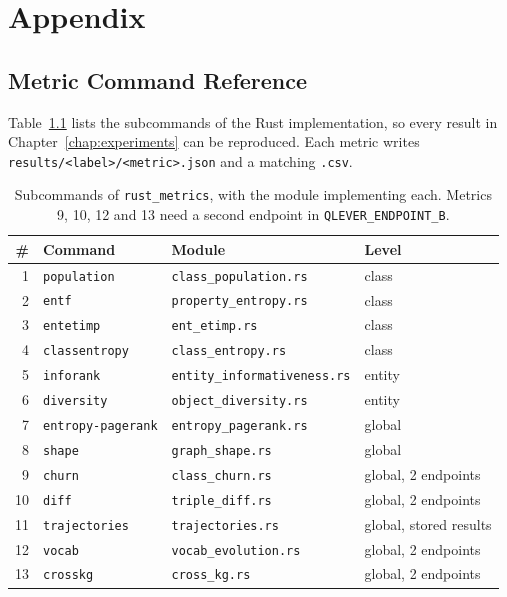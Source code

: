 \chapter{Appendix}
\label{chap:appendix}

\section{Metric Command Reference}
\label{sec:appendix_commands}

Table~\ref{tab:commands} lists the subcommands of the Rust implementation, so
every result in Chapter~\ref{chap:experiments} can be reproduced. Each metric
writes \texttt{results/<label>/<metric>.json} and a matching \texttt{.csv}.

\begin{table}[htbp]
  \centering
  \caption[]{Subcommands of \texttt{rust\_metrics}, with
    the module implementing each. Metrics 9, 10, 12 and 13 need a second
    endpoint in \texttt{QLEVER\_ENDPOINT\_B}.}
  \label{tab:commands}
  \footnotesize
  \begin{tabular}{rlll}
    \toprule
    \# & Command & Module & Level \\
    \midrule
    1  & \texttt{population}       & \texttt{class\_population.rs}       & class \\
    2  & \texttt{entf}             & \texttt{property\_entropy.rs}       & class \\
    3  & \texttt{entetimp}         & \texttt{ent\_etimp.rs}              & class \\
    4  & \texttt{classentropy}     & \texttt{class\_entropy.rs}          & class \\
    5  & \texttt{inforank}         & \texttt{entity\_informativeness.rs} & entity \\
    6  & \texttt{diversity}        & \texttt{object\_diversity.rs}       & entity \\
    7  & \texttt{entropy-pagerank} & \texttt{entropy\_pagerank.rs}       & global \\
    8  & \texttt{shape}            & \texttt{graph\_shape.rs}            & global \\
    9  & \texttt{churn}            & \texttt{class\_churn.rs}            & global, 2 endpoints \\
    10 & \texttt{diff}             & \texttt{triple\_diff.rs}            & global, 2 endpoints \\
    11 & \texttt{trajectories}     & \texttt{trajectories.rs}            & global, stored results \\
    12 & \texttt{vocab}            & \texttt{vocab\_evolution.rs}        & global, 2 endpoints \\
    13 & \texttt{crosskg}          & \texttt{cross\_kg.rs}               & global, 2 endpoints \\
    \bottomrule
  \end{tabular}
\end{table}


